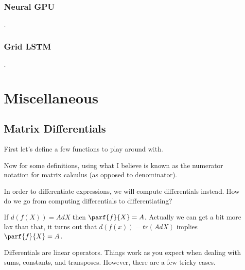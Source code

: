 \documentclass[12pt]{article}
\begin{document}
\subsubsection{Neural GPU}
.
\subsubsection{Grid LSTM}
.
\section{Miscellaneous}

\subsection{Matrix Differentials}

First let's define a few functions to play around with.


Now for some definitions, using what I believe is known as the numerator notation for matrix calculus (as opposed to denominator).



In order to differentiate expressions, we will compute differentials instead. How do we go from computing differentials to differentiating?

If $d(f(X)) = AdX$ then $\parf{f}{X} = A$. Actually we can get a bit more lax than that, it turns out that $d(f(x)) = tr(AdX)$ implies $\parf{f}{X} = A$. 

Differentials are linear operators. Things work as you expect when dealing with sums, constants, and transposes. However, there are a few tricky cases.
\end{document}
